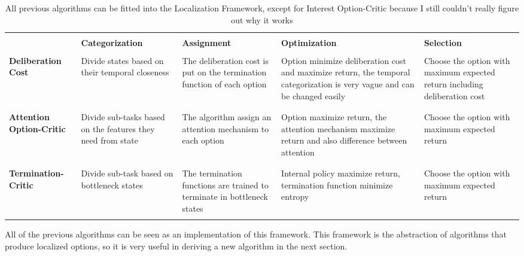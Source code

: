 \documentclass{article}
\begin{document}
	\begin{table}[H]
		\begin{center}
			\begin{tabular}{|p{23mm}||p{30mm}|p{30mm}|p{30mm}|p{30mm}|}
				\hline
				&&&&\\
				&\centering \bfseries Categorization&\centering \bfseries Assignment&\centering \bfseries Optimization&\bfseries \hspace{0.25in} Selection \\
				\hline\hline
				&&&&\\
				\bfseries Deliberation Cost&\small Divide states based on their temporal closeness&\small The deliberation cost is put on the termination function of each option&\small Option minimize deliberation cost and maximize return, the temporal categorization is very vague and can be changed easily &\small Choose the option with maximum expected return including deliberation cost\\
				&&&&\\
				\hline
				&&&&\\
				\bfseries Attention Option-Critic&\small Divide sub-tasks based on the features they need from state&\small The algorithm assign an attention mechanism to each option&\small Option maximize return, the attention mechanism maximize return and also difference between attention&\small Choose the option with maximum expected return\\
				&&&&\\
				\hline
				&&&&\\
				\bfseries Termination-Critic&\small Divide sub-task based on bottleneck states&\small The termination functions are trained to terminate in bottleneck states&\small Internal policy maximize return, termination function minimize entropy&\small Choose the option with maximum expected return\\
				&&&&\\
				\hline
			\end{tabular}
			\caption{All previous algorithms can be fitted into the Localization Framework, except for Interest Option-Critic because I still couldn't really figure out why it works}
		\end{center}
	\end{table}
	\quad All of the previous algorithms can be seen as an implementation of this framework. This framework is the abstraction of algorithms that produce localized options, so it is very useful in deriving a new algorithm in the next section.
\end{document}
